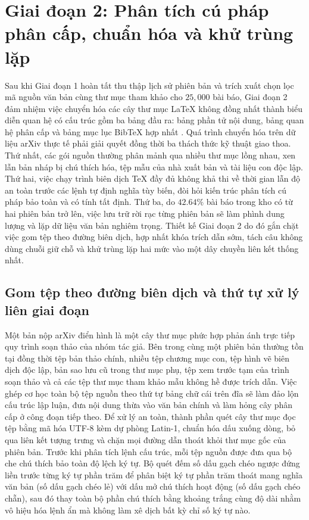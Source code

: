 \section{Giai đoạn 2: Phân tích cú pháp phân cấp, chuẩn hóa và khử trùng lặp}

Sau khi Giai đoạn 1 hoàn tất thu thập lịch sử phiên bản và trích xuất chọn lọc mã nguồn văn bản cùng thư mục tham khảo cho $25{,}000$ bài báo, Giai đoạn 2 đảm nhiệm việc chuyển hóa các cây thư mục LaTeX không đồng nhất thành biểu diễn quan hệ có cấu trúc gồm ba bảng đầu ra: bảng phần tử nội dung, bảng quan hệ phân cấp và bảng mục lục BibTeX hợp nhất \cite{hcmus_intro_ds}. Quá trình chuyển hóa trên dữ liệu arXiv thực tế phải giải quyết đồng thời ba thách thức kỹ thuật giao thoa. Thứ nhất, các gói nguồn thường phân mảnh qua nhiều thư mục lồng nhau, xen lẫn bản nháp bị chú thích hóa, tệp mẫu của nhà xuất bản và tài liệu con độc lập. Thứ hai, việc chạy trình biên dịch TeX đầy đủ không khả thi về thời gian lẫn độ an toàn trước các lệnh tự định nghĩa tùy biến, đòi hỏi kiến trúc phân tích cú pháp bảo toàn và có tính tất định. Thứ ba, do $42.64\%$ bài báo trong kho có từ hai phiên bản trở lên, việc lưu trữ rời rạc từng phiên bản sẽ làm phình dung lượng và lặp dữ liệu văn bản nghiêm trọng. Thiết kế Giai đoạn 2 do đó gắn chặt việc gom tệp theo đường biên dịch, hợp nhất khóa trích dẫn sớm, tách câu không dùng chuỗi giữ chỗ và khử trùng lặp hai mức vào một dây chuyền liên kết thống nhất.

\subsection{Gom tệp theo đường biên dịch và thứ tự xử lý liên giai đoạn}

Một bản nộp arXiv điển hình là một cây thư mục phức hợp phản ánh trực tiếp quy trình soạn thảo của nhóm tác giả. Bên trong cùng một phiên bản thường tồn tại đồng thời tệp bản thảo chính, nhiều tệp chương mục con, tệp hình vẽ biên dịch độc lập, bản sao lưu cũ trong thư mục phụ, tệp xem trước tạm của trình soạn thảo và cả các tệp thư mục tham khảo mẫu không hề được trích dẫn. Việc ghép cơ học toàn bộ tệp nguồn theo thứ tự bảng chữ cái trên đĩa sẽ làm đảo lộn cấu trúc lập luận, đưa nội dung thừa vào văn bản chính và làm hỏng cây phân cấp ở công đoạn tiếp theo. Để xử lý an toàn, thành phần quét cây thư mục đọc tệp bằng mã hóa UTF-8 kèm dự phòng Latin-1, chuẩn hóa dấu xuống dòng, bỏ qua liên kết tượng trưng và chặn mọi đường dẫn thoát khỏi thư mục gốc của phiên bản. Trước khi phân tích lệnh cấu trúc, mỗi tệp nguồn được đưa qua bộ che chú thích bảo toàn độ lệch ký tự. Bộ quét đếm số dấu gạch chéo ngược đứng liền trước từng ký tự phần trăm để phân biệt ký tự phần trăm thoát mang nghĩa văn bản (số dấu gạch chéo lẻ) với dấu mở chú thích hoạt động (số dấu gạch chéo chẵn), sau đó thay toàn bộ phần chú thích bằng khoảng trắng cùng độ dài nhằm vô hiệu hóa lệnh ẩn mà không làm xê dịch bất kỳ chỉ số ký tự nào.

